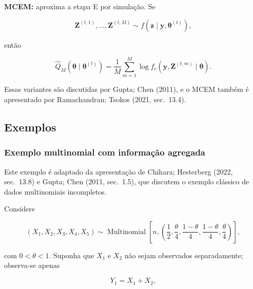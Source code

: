 \documentclass[
  letterpaper,
  DIV=11,
  numbers=noendperiod]{scrreprt}
\begin{document}
\textbf{MCEM:} aproxima a etapa E por simulação. Se

\[\boldsymbol{Z}^{(t,1)},\ldots,\boldsymbol{Z}^{(t,M)}
\sim
f(\boldsymbol{z}\mid\boldsymbol{y},\boldsymbol{\theta}^{(t)}),\]

então

\[\widehat{Q}_M(\boldsymbol{\theta}\mid\boldsymbol{\theta}^{(t)})
=
\frac{1}{M}
\sum_{m=1}^M
\log f_c
\left(
\boldsymbol{y},\boldsymbol{Z}^{(t,m)}
\mid
\boldsymbol{\theta}
\right).\]

Essas variantes são discutidas por Gupta; Chen (2011), e o MCEM também é
apresentado por Ramachandran; Tsokos (2021, sec.~13.4).

\subsection{Exemplos}\label{exemplos-2}

\subsubsection{Exemplo multinomial com informação
agregada}\label{exemplo-multinomial-com-informauxe7uxe3o-agregada}

\begin{tcolorbox}[enhanced jigsaw, colback=white, leftrule=.75mm, colbacktitle=quarto-callout-tip-color!10!white, breakable, titlerule=0mm, bottomtitle=1mm, title=\textcolor{quarto-callout-tip-color}{\faLightbulb}\hspace{0.5em}{Exemplo 1 --- informação incompleta em uma distribuição multinomial}, colframe=quarto-callout-tip-color-frame, toprule=.15mm, opacityback=0, bottomrule=.15mm, opacitybacktitle=0.6, arc=.35mm, toptitle=1mm, rightrule=.15mm, coltitle=black, left=2mm]

Este exemplo é adaptado da apresentação de Chihara; Hesterberg (2022,
sec.~13.8) e Gupta; Chen (2011, sec.~1.5), que discutem o exemplo
clássico de dados multinomiais incompletos.

\end{tcolorbox}

Considere

\[(X_1,X_2,X_3,X_4,X_5)
\sim
\operatorname{Multinomial}
\left[
 n,
\left(
\frac12,
\frac{\theta}{4},
\frac{1-\theta}{4},
\frac{1-\theta}{4},
\frac{\theta}{4}
\right)
\right],\]

com \(0<\theta<1\). Suponha que \(X_1\) e \(X_2\) não sejam observados
separadamente; observa-se apenas

\[Y_1=X_1+X_2,\]
\end{document}
